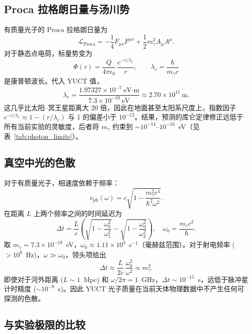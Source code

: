 \documentclass[12pt,a4paper]{article}
\begin{document}
	\subsection{Proca 拉格朗日量与汤川势}
	
	有质量光子的 Proca 拉格朗日量为
	\[
	\mathcal{L}_{\text{Proca}} = -\frac14 F_{\mu\nu}F^{\mu\nu} + \frac12 m_\gamma^2 A_\mu A^\mu .
	\]
	对于静态点电荷，标量势变为
	\[
	\Phi(r) = \frac{Q}{4\pi\epsilon_0}\,\frac{e^{-r/\lambda_c}}{r},
	\qquad
	\lambda_c = \frac{\hbar}{m_\gamma c}
	\]
	是康普顿波长。代入 YUCT 值，
	\[
	\lambda_c = \frac{1.97327\times10^{-7}~\text{eV·m}}{7.3\times10^{-19}~\text{eV}}
	\approx 2.70\times10^{11}~\text{m}.
	\]
	这几乎比太阳–冥王星距离大 20 倍，因此在地面甚至太阳系尺度上，指数因子 \(e^{-r/\lambda_c}\approx 1 - (r/\lambda_c)\) 与 1 的偏差小于 \(10^{-12}\)。结果，预测的库仑定律修正远低于所有当前实验的灵敏度，后者将 \(m_\gamma\) 约束到 \(\sim 10^{-14}\)–\(10^{-16}\)~eV（见表~\ref{tab:photon_limits}）。
	
	\subsection{真空中光的色散}
	
	对于有质量光子，相速度依赖于频率：
	\[
	v_{\text{ph}}(\omega) = c\sqrt{1 - \frac{m_\gamma^2 c^4}{\hbar^2\omega^2}} .
	\]
	在距离 \(L\) 上两个频率之间的时间延迟为
	\[
	\Delta t = \frac{L}{c}\left( \sqrt{1-\frac{\omega_0^2}{\omega_1^2}} - \sqrt{1-\frac{\omega_0^2}{\omega_2^2}} \right),
	\quad \omega_0 = \frac{m_\gamma c^2}{\hbar}.
	\]
	取 \(m_\gamma = 7.3\times10^{-19}\)~eV，\(\omega_0 \approx 1.11\times10^{3}\)~s\(^{-1}\)（毫赫兹范围）。对于射电频率 (\(>10^8\)~Hz)，\(\omega \gg \omega_0\)，领头项给出
	\[
	\Delta t \approx \frac{L}{2c}\,\frac{\omega_0^2}{\omega^2} \propto m_\gamma^2.
	\]
	即使对于河外距离 (\(L\sim 1\)~Mpc) 和 \(\omega/2\pi = 1\)~GHz，\(\Delta t \sim 10^{-15}\)~s，远低于脉冲星计时精度 (\(\sim 10^{-9}\)~s)。因此 YUCT 光子质量在当前天体物理数据中不产生任何可探测的色散。
	
	\subsection{与实验极限的比较}
	
\end{document}
